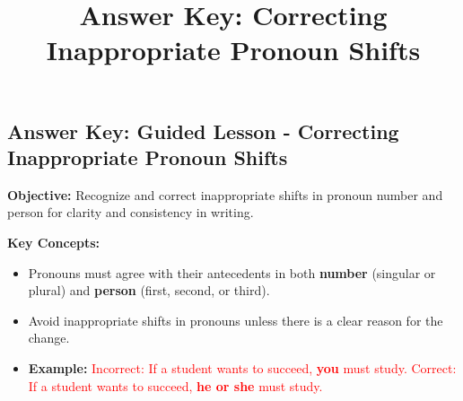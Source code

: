 \documentclass[12pt]{article}
\title{\textbf{Answer Key: Correcting Inappropriate Pronoun Shifts}}
\date{}
\begin{document}
\subsection*{\textbf{Answer Key: Guided Lesson - Correcting Inappropriate Pronoun Shifts}}
\onehalfspacing

\begin{tcolorbox}[colframe=black!40, colback=gray!5, 
coltitle=black, colbacktitle=black!20, fonttitle=\bfseries\Large, 
title=Learning Objective, halign title=center, left=5pt, right=5pt, top=5pt, bottom=15pt]
\textbf{Objective:} Recognize and correct inappropriate shifts in pronoun number and person for clarity and consistency in writing.
\end{tcolorbox}

\vspace{1em}

\begin{tcolorbox}[colframe=black!60, colback=white, 
coltitle=black, colbacktitle=black!15, fonttitle=\bfseries\Large, 
title=Key Concepts and Vocabulary, halign title=center, left=10pt, right=10pt, top=10pt, bottom=15pt]
\textbf{Key Concepts:}
\begin{itemize}
    \item Pronouns must agree with their antecedents in both \textbf{number} (singular or plural) and \textbf{person} (first, second, or third).
    \item Avoid inappropriate shifts in pronouns unless there is a clear reason for the change.
    \item \textbf{Example:}  
    \textcolor{red}{Incorrect: If a student wants to succeed, \textbf{you} must study.}  
    \textcolor{red}{Correct: If a student wants to succeed, \textbf{he or she} must study.}  
\end{itemize}
\end{tcolorbox}

\vspace{1em}
\end{document}
